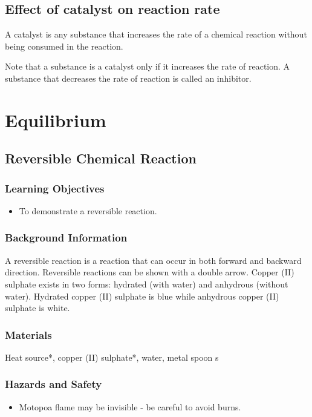\subsection{Effect of catalyst on reaction rate}

A catalyst is any substance that increases the rate of a chemical reaction without being consumed in the reaction. 

Note that a substance is a catalyst only if it increases the rate of reaction. A substance that decreases the rate of reaction is called an inhibitor.

\section{Equilibrium}

\subsection{Reversible Chemical Reaction}

\subsubsection*{Learning Objectives}
\begin{itemize}
\item{To demonstrate a reversible reaction.}
\end{itemize}

\subsubsection*{Background Information}
A reversible reaction is a reaction that can occur in both forward and backward direction. Reversible reactions can be shown with a double arrow. Copper (II) sulphate exists in two forms: hydrated (with water) and anhydrous (without water). Hydrated copper (II) sulphate is blue while anhydrous copper (II) sulphate is white.

\subsubsection*{Materials}
Heat source*, copper (II) sulphate*, water, metal spoon
s
\subsubsection*{Hazards and Safety}
\begin{itemize}
\item{Motopoa flame may be invisible - be careful to avoid burns.}
\end{itemize}

